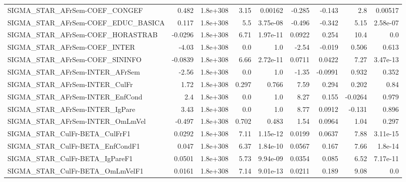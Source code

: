 \begin{tabular}{lrrrrrrrr}
SIGMA\_STAR\_AFrSem-COEF\_CONGEF         &       0.482 &     1.8e+308 &     3.15 &  0.00162 &     -0.285 &      -0.143 &          2.8 &       0.00517 \\
SIGMA\_STAR\_AFrSem-COEF\_EDUC\_BASICA    &       0.117 &     1.8e+308 &      5.5 & 3.75e-08 &     -0.496 &      -0.342 &         5.15 &      2.58e-07 \\
SIGMA\_STAR\_AFrSem-COEF\_HORASTRAB      &     -0.0296 &     1.8e+308 &     6.71 & 1.97e-11 &     0.0922 &       0.254 &         10.4 &           0.0 \\
SIGMA\_STAR\_AFrSem-COEF\_INTER          &       -4.03 &     1.8e+308 &      0.0 &      1.0 &      -2.54 &      -0.019 &        0.506 &         0.613 \\
SIGMA\_STAR\_AFrSem-COEF\_SININFO        &     -0.0839 &     1.8e+308 &     6.66 & 2.72e-11 &     0.0711 &      0.0422 &         7.27 &      3.47e-13 \\
SIGMA\_STAR\_AFrSem-INTER\_AFrSem        &       -2.56 &     1.8e+308 &      0.0 &      1.0 &      -1.35 &     -0.0991 &        0.932 &         0.352 \\
SIGMA\_STAR\_AFrSem-INTER\_CulFr         &        1.72 &     1.8e+308 &    0.297 &    0.766 &       7.59 &       0.294 &        0.202 &          0.84 \\
SIGMA\_STAR\_AFrSem-INTER\_EnfCond       &         2.4 &     1.8e+308 &      0.0 &      1.0 &       8.27 &       0.155 &      -0.0264 &         0.979 \\
SIGMA\_STAR\_AFrSem-INTER\_IgPare        &        3.43 &     1.8e+308 &      0.0 &      1.0 &       8.77 &      0.0912 &       -0.131 &         0.896 \\
SIGMA\_STAR\_AFrSem-INTER\_OmLmVel       &      -0.497 &     1.8e+308 &    0.702 &    0.483 &       1.54 &      0.0964 &         1.04 &         0.297 \\
SIGMA\_STAR\_CulFr-BETA\_CulFrF1         &      0.0292 &     1.8e+308 &     7.11 & 1.15e-12 &     0.0199 &      0.0637 &         7.88 &      3.11e-15 \\
SIGMA\_STAR\_CulFr-BETA\_EnfCondF1       &       0.047 &     1.8e+308 &     6.37 & 1.84e-10 &     0.0567 &       0.167 &         7.66 &       1.8e-14 \\
SIGMA\_STAR\_CulFr-BETA\_IgPareF1        &      0.0501 &     1.8e+308 &     5.73 & 9.94e-09 &     0.0354 &       0.085 &         6.52 &      7.17e-11 \\
SIGMA\_STAR\_CulFr-BETA\_OmLmVelF1       &      0.0161 &     1.8e+308 &     7.14 & 9.01e-13 &     0.0211 &       0.189 &         9.08 &           0.0 \\

\end{tabular}
